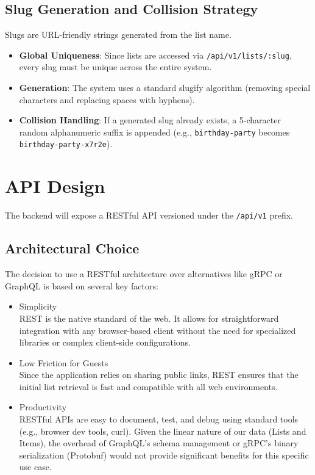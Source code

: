 \subsection{Slug Generation and Collision Strategy}
Slugs are URL-friendly strings generated from the list name.
\begin{itemize}
    \item \textbf{Global Uniqueness}: Since lists are accessed via \texttt{/api/v1/lists/:slug}, every slug must be unique across the entire system.
    \item \textbf{Generation}: The system uses a standard slugify algorithm (removing special characters and replacing spaces with hyphens).
    \item \textbf{Collision Handling}: If a generated slug already exists, a 5-character random alphanumeric suffix is appended (e.g., \texttt{birthday-party} becomes \texttt{birthday-party-x7r2e}).
\end{itemize}

\section{API Design}
The backend will expose a RESTful API versioned under the \texttt{/api/v1} prefix.

\subsection{Architectural Choice}
The decision to use a RESTful architecture over alternatives like gRPC or GraphQL is based on several key factors:
\begin{itemize}
    \item Simplicity \\
        REST is the native standard of the web. It allows for straightforward integration with any browser-based client without the need for specialized libraries or complex client-side configurations.
    \item Low Friction for Guests \\
        Since the application relies on sharing public links, REST ensures that the initial list retrieval is fast and compatible with all web environments.
    \item Productivity \\
        RESTful APIs are easy to document, test, and debug using standard tools (e.g., browser dev tools, curl). Given the linear nature of our data (Lists and Items), the overhead of GraphQL's schema management or gRPC's binary serialization (Protobuf) would not provide significant benefits for this specific use case.
\end{itemize}

